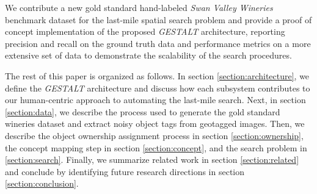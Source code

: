We contribute a new gold standard hand-labeled \textit{Swan Valley Wineries} benchmark dataset for the last-mile spatial search problem and provide a proof of concept implementation of the proposed \emph{GESTALT} architecture, reporting precision and recall on the ground truth data and performance metrics on a more extensive set of data to demonstrate the scalability of the search procedures.

The rest of this paper is organized as follows. In section \ref{section:architecture}, we define the \emph{GESTALT} architecture and discuss how each subsystem contributes to our human-centric approach to automating the last-mile search. 
Next, in section \ref{section:data}, we describe the process used to generate the gold standard wineries dataset and extract noisy object tags from geotagged images. Then, we describe the object ownership assignment process in section \ref{section:ownership}, the concept mapping step in section \ref{section:concept}, and the search problem in \ref{section:search}. 
Finally, we summarize related work in section \ref{section:related} and conclude by identifying future research directions in section \ref{section:conclusion}.





